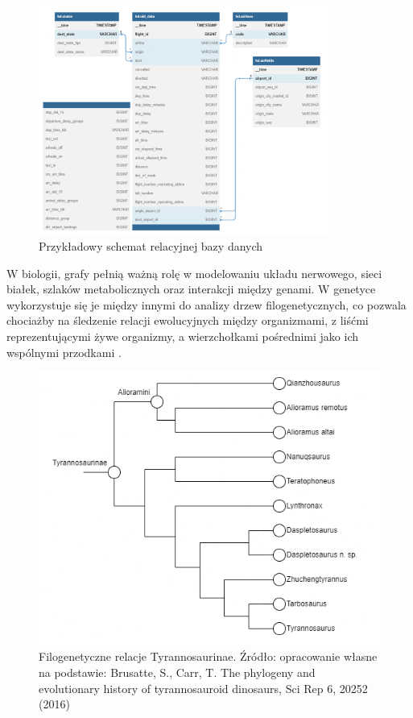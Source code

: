 \begin{figure}[ht]
	\centering
	\includegraphics[height=7.5cm]{partials/images/intro_database.png}
	\caption{Przykładowy schemat relacyjnej bazy danych}
    \label{Fig:intro-2}
\end{figure}

W biologii, grafy pełnią ważną rolę w modelowaniu układu nerwowego, sieci białek,
szlaków metabolicznych oraz interakcji między genami.
W genetyce wykorzystuje się je między innymi do analizy drzew filogenetycznych,
co pozwala chociażby na śledzenie relacji ewolucyjnych między organizmami,
z liśćmi reprezentującymi żywe organizmy, a wierzchołkami pośrednimi jako ich wspólnymi przodkami \cite{Erciyes2023}.

\begin{figure}[ht]
	\centering
	\includegraphics[width=12cm]{partials/images/intro_dino.png}
	\caption{Filogenetyczne relacje Tyrannosaurinae.
		Źródło: opracowanie własne na podstawie: Brusatte, S., Carr, T.
		The phylogeny and evolutionary history of tyrannosauroid dinosaurs, Sci Rep 6, 20252 (2016)}
    \label{Fig:intro-3}
\end{figure}

